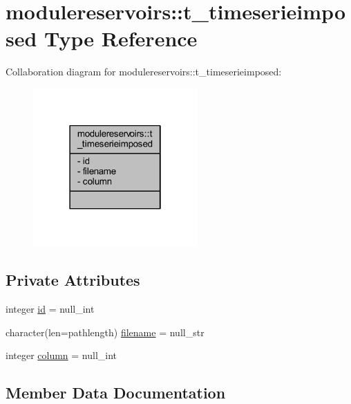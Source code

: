 \hypertarget{structmodulereservoirs_1_1t__timeserieimposed}{}\section{modulereservoirs\+:\+:t\+\_\+timeserieimposed Type Reference}
\label{structmodulereservoirs_1_1t__timeserieimposed}


Collaboration diagram for modulereservoirs\+:\+:t\+\_\+timeserieimposed\+:\nopagebreak
\begin{figure}[H]
\begin{center}
\leavevmode
\includegraphics[width=178pt]{structmodulereservoirs_1_1t__timeserieimposed__coll__graph}
\end{center}
\end{figure}
\subsection*{Private Attributes}
\begin{DoxyCompactItemize}
\item 
integer \mbox{\hyperlink{structmodulereservoirs_1_1t__timeserieimposed_aa207f2819f335ad7b93216bf27bb96b1}{id}} = null\+\_\+int
\item 
character(len=pathlength) \mbox{\hyperlink{structmodulereservoirs_1_1t__timeserieimposed_a156743e54111b88e73da52154dfa66f5}{filename}} = null\+\_\+str
\item 
integer \mbox{\hyperlink{structmodulereservoirs_1_1t__timeserieimposed_a2665fe17c082b54c1d19874401597b6d}{column}} = null\+\_\+int
\end{DoxyCompactItemize}


\subsection{Member Data Documentation}
\mbox{\label{structmodulereservoirs_1_1t__timeserieimposed_a2665fe17c082b54c1d19874401597b6d}} 
